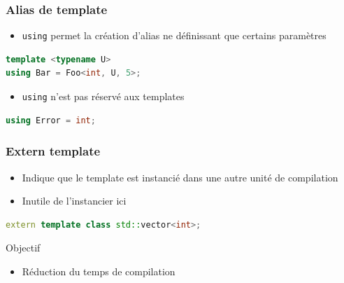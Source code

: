 \documentclass[C++.tex]{subfiles}
\begin{document}
\begin{frame}[fragile]
	\frametitle{Alias de template}
	\begin{itemize}
		\item \lstinline|using| permet la création d'alias ne définissant que certains paramètres
	\end{itemize}

	\begin{lstlisting}[language=C++]
template <typename U>
using Bar = Foo<int, U, 5>;\end{lstlisting}

	\pause

	\begin{itemize}
		\item \lstinline|using| n'est pas réservé aux templates
	\end{itemize}


	\begin{lstlisting}[language=C++]
using Error = int;\end{lstlisting}
\end{frame}

\begin{frame}[fragile]
	\frametitle{Extern template}
	\begin{itemize}
		\item Indique que le template est instancié dans une autre unité de compilation
		\item Inutile de l'instancier ici
	\end{itemize}

	\begin{lstlisting}[language=C++]
extern template class std::vector<int>;\end{lstlisting}

	\begin{block}{Objectif}
		\begin{itemize}
			\item Réduction du temps de compilation
		\end{itemize}
	\end{block}
\end{frame}
\end{document}
